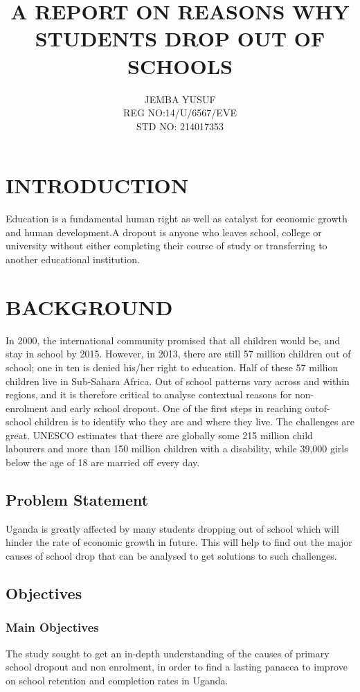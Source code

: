 \documentclass[12pt,letterpaper]{article}
\title{A REPORT ON REASONS WHY STUDENTS DROP OUT OF SCHOOLS}
\author{JEMBA YUSUF\\	REG NO:14/U/6567/EVE\\	STD NO: 214017353}
\begin{document}
\maketitle{}
\newpage
{}
\section{INTRODUCTION}
  Education is a fundamental human right as well as catalyst for economic growth and human development.A dropout is anyone who leaves school, college or university without either completing their course of study or transferring to another educational institution.  
\section{BACKGROUND}
In 2000, the international community promised that all children would be, and stay in school by 2015.
However, in 2013, there are still 57 million children out of school; one in ten is denied his/her right to
education. Half of these 57 million children live in Sub-Sahara Africa. Out of school patterns vary
across and within regions, and it is therefore critical to analyse contextual reasons
for non-enrolment and early school dropout. One of the first steps in reaching outof-school
children is to identify who they are and where they live. The challenges are
great. UNESCO estimates that there are globally some 215 million child labourers and more than 150
million children with a disability, while 39,000 girls below the age of 18 are married off every day.

   
\subsection{Problem Statement}
 Uganda is greatly affected by many students dropping out of school which will hinder the rate of economic growth in future. This will help to find out the major causes of school drop that can be analysed to get solutions to such challenges.
  \subsection{Objectives}
  \subsubsection{Main Objectives}
   The study sought to get an in-depth understanding of the causes of primary school dropout and non enrolment, in order to find a lasting panacea to improve on school retention and completion rates in
   Uganda. 
   
\end{document}
